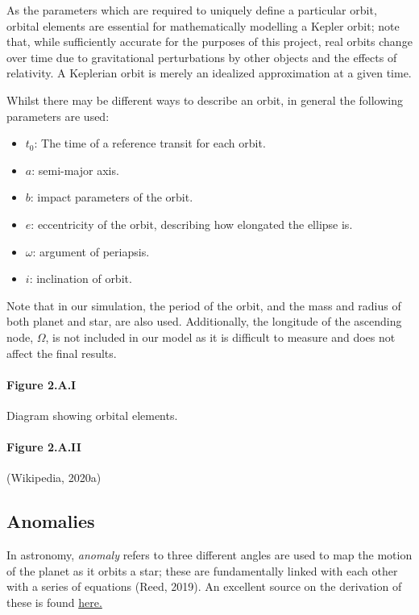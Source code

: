 \documentclass[11pt]{article}
\begin{document}
As the parameters which are required to uniquely define a particular
orbit, orbital elements are essential for mathematically modelling a
Kepler orbit; note that, while sufficiently accurate for the purposes of
this project, real orbits change over time due to gravitational
perturbations by other objects and the effects of relativity. A
Keplerian orbit is merely an idealized approximation at a given time.

Whilst there may be different ways to describe an orbit, in general the
following parameters are used: 

\begin{itemize}
	\item \(t_{0}\): The time of a reference transit for each orbit.
	\item \(a\): semi-major axis.
	\item \(b\): impact parameters of the orbit.
	\item \(e\): eccentricity of the orbit, describing how elongated the ellipse is.
	\item \(\omega\): argument of periapsis.
	\item \(i\): inclination of orbit.
\end{itemize}

Note that in our simulation, the period of the orbit, and the mass and
radius of both planet and star, are also used. Additionally, the
longitude of the ascending node, \(\Omega\), is not included in our
model as it is difficult to measure and does not affect the final
results.

    \hypertarget{figure-2.a.i}{%
\paragraph{Figure 2.A.I}\label{figure-2.a.i}}

Diagram showing orbital elements.

    \hypertarget{figure-2.a.ii}{%
\paragraph{Figure 2.A.II}\label{figure-2.a.ii}}

(Wikipedia, 2020a)

    \hypertarget{anomalies}{%
\subsection{Anomalies}\label{anomalies}}

In astronomy, \emph{anomaly} refers to three different angles are used
to map the motion of the planet as it orbits a star; these are
fundamentally linked with each other with a series of equations (Reed,
2019). An excellent source on the derivation of these is found
\href{http://www.bogan.ca/orbits/kepler/e_anomly.html}{here.}
\end{document}
